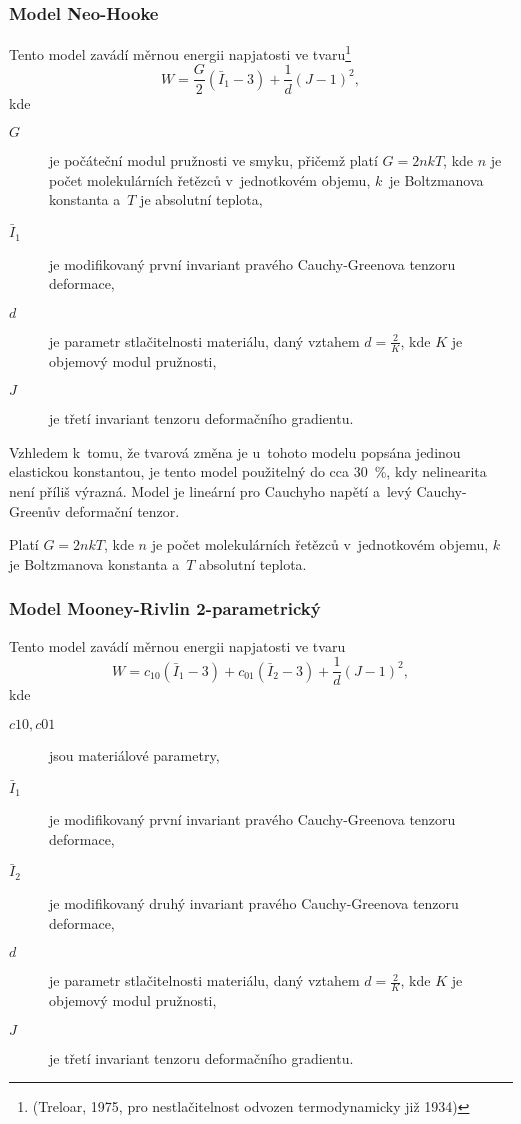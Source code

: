 \subsubsection{Model Neo-Hooke}
Tento model zavádí měrnou energii napjatosti ve tvaru\footnote{(Treloar, 1975, pro nestlačitelnost odvozen termodynamicky již 1934)}
\begin{equation}\label{neo_hooke}
	W = \frac{G}{2} \left( \bar{I}_1 - 3 \right) + \frac{1}{d} \left( J - 1 \right)^2,
\end{equation}
kde
\begin{description}
	\item[$G$] je počáteční modul pružnosti ve smyku, přičemž platí $G = 2nkT$, kde $n$ je počet molekulárních řetězců v~jednotkovém objemu, $k$~je Boltzmanova konstanta a~$T$ je absolutní teplota,
	\item[$\bar{I}_1$] je modifikovaný první invariant pravého Cauchy-Greenova tenzoru deformace,
	\item[$d$] je parametr stlačitelnosti materiálu, daný vztahem $d = \frac{2}{K}$, kde $K$ je objemový modul pružnosti,
	\item[$J$] je třetí invariant tenzoru deformačního gradientu.
\end{description}

Vzhledem k~tomu, že tvarová změna je u~tohoto modelu popsána jedinou elastickou konstantou, je tento model použitelný do cca \SI{30}{\percent}, kdy nelinearita není příliš výrazná. Model je lineární pro Cauchyho napětí a~levý Cauchy-Greenův deformační tenzor.

Platí $G = 2nkT$, kde $n$ je počet molekulárních řetězců v~jednotkovém objemu, $k$ je Boltzmanova konstanta a~$T$ absolutní teplota.

\subsubsection{Model Mooney-Rivlin 2-parametrický}
Tento model zavádí měrnou energii napjatosti ve tvaru
\begin{equation}
	W = c_{10} \left(\bar{I}_1 - 3\right) + c_{01} \left(\bar{I}_2 - 3\right) + \frac{1}{d} \left(J - 1\right)^2,
\end{equation}
kde
\begin{description}
	\item[$c10, c01$] jsou materiálové parametry,
	\item[$\bar{I}_1$] je modifikovaný první invariant pravého Cauchy-Greenova tenzoru deformace,
	\item[$\bar{I}_2$] je modifikovaný druhý invariant pravého Cauchy-Greenova tenzoru deformace,
	\item[$d$] je parametr stlačitelnosti materiálu, daný vztahem $d = \frac{2}{K}$, kde $K$ je objemový modul pružnosti,
	\item[$J$] je třetí invariant tenzoru deformačního gradientu.
\end{description}


